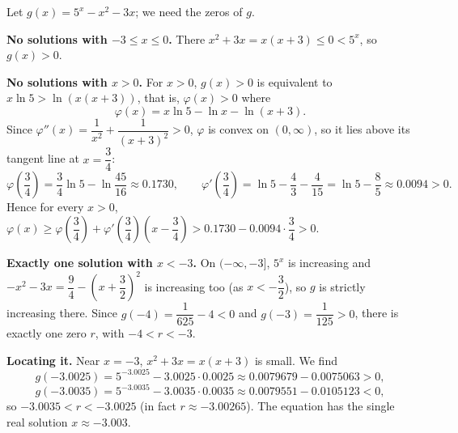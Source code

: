 Let $g(x)=5^x-x^2-3x$; we need the zeros of $g$.

\textbf{No solutions with $-3\le x\le0$.} There $x^2+3x=x(x+3)\le0<5^x$, so $g(x)>0$.

\textbf{No solutions with $x>0$.} For $x>0$, $g(x)>0$ is equivalent to $x\ln5>\ln\left(x(x+3)\right)$, that is, $\varphi(x)>0$ where
\[\varphi(x)=x\ln5-\ln x-\ln(x+3).\]
Since $\varphi''(x)=\dfrac{1}{x^2}+\dfrac{1}{(x+3)^2}>0$, $\varphi$ is convex on $(0,\infty)$, so it lies above its tangent line at $x=\dfrac34$:
\[\varphi\left(\dfrac34\right)=\dfrac34\ln5-\ln\dfrac{45}{16}\approx0.1730,\qquad\varphi'\left(\dfrac34\right)=\ln5-\dfrac43-\dfrac{4}{15}=\ln5-\dfrac85\approx0.0094>0.\]
Hence for every $x>0$, $\varphi(x)\ge\varphi\left(\dfrac34\right)+\varphi'\left(\dfrac34\right)\left(x-\dfrac34\right)>0.1730-0.0094\cdot\dfrac34>0$.

\textbf{Exactly one solution with $x<-3$.} On $(-\infty,-3]$, $5^x$ is increasing and $-x^2-3x=\dfrac94-\left(x+\dfrac32\right)^2$ is increasing too (as $x<-\dfrac32$), so $g$ is strictly increasing there. Since $g(-4)=\dfrac{1}{625}-4<0$ and $g(-3)=\dfrac{1}{125}>0$, there is exactly one zero $r$, with $-4<r<-3$.

\textbf{Locating it.} Near $x=-3$, $x^2+3x=x(x+3)$ is small. We find
\[g(-3.0025)=5^{-3.0025}-3.0025\cdot0.0025\approx0.0079679-0.0075063>0,\]
\[g(-3.0035)=5^{-3.0035}-3.0035\cdot0.0035\approx0.0079551-0.0105123<0,\]
so $-3.0035<r<-3.0025$ (in fact $r\approx-3.00265$). The equation has the single real solution $\boxed{x\approx-3.003}$.
